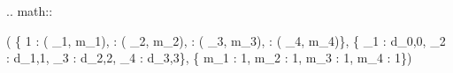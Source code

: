 .. math::

	\left ( \left \{ 1 : \left ( \lambda_{1}, \quad m_{1}\right ),  : \left ( \lambda_{2}, \quad m_{2}\right ),  : \left ( \lambda_{3}, \quad m_{3}\right ),  : \left ( \lambda_{4}, \quad m_{4}\right )\right \}, \quad \left \{ \lambda_{1} : d_{0,0}, \quad \lambda_{2} : d_{1,1}, \quad \lambda_{3} : d_{2,2}, \quad \lambda_{4} : d_{3,3}\right \}, \quad \left \{ m_{1} : 1, \quad m_{2} : 1, \quad m_{3} : 1, \quad m_{4} : 1\right \}\right )
